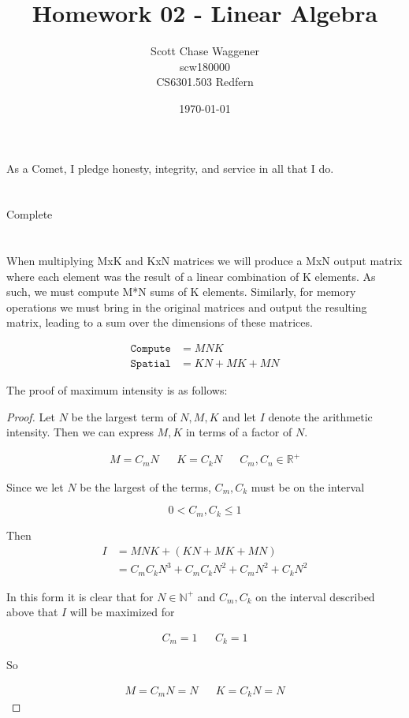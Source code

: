 \documentclass[12pt]{article}
\title{Homework 02 - Linear Algebra}
\author{
        Scott Chase Waggener \\
		scw180000 \\
		CS6301.503 Redfern
}
\date{\today}
\begin{document}
\maketitle
\begin{center}
As a Comet, I pledge honesty, integrity, and service in all that I do.
\end{center}

\section{}
Complete

\section{}
When multiplying MxK and KxN matrices we will produce a MxN output matrix
where each element was the result of a linear combination of K elements.
As such, we must compute M*N sums of K elements.
Similarly, for memory operations we must bring in the original matrices and output
the resulting matrix, leading to a sum over the dimensions of these matrices.

\begin{align}
	\texttt{Compute} &= M N K \\
	\texttt{Spatial} &= KN + MK + MN
\end{align}

The proof of maximum intensity is as follows:

\begin{proof}
	Let $N$ be the largest term of $N, M, K$ and let $I$ denote the arithmetic
	intensity. Then we can express $M, K$ in terms of a factor of $N$.

	\begin{align}
		M = C_m N && K = C_k N && C_m, C_n \in \mathbb R^+
	\end{align}

	Since we let $N$ be the largest of the terms, $C_m, C_k$ must be on the
	interval

	\begin{equation}
		0 < C_m, C_k \leq 1
	\end{equation}

	Then
	\begin{align}
		I &= M N K + \left(K N + M K + M N \right)\\
		& = C_m C_k N^3 + C_m C_k N^2 + C_m N^2 + C_k N^2
	\end{align}

	In this form it is clear that for $N \in \mathbb N^+$ and $C_m, C_k$ on the
	interval described above that $I$ will be maximized for

	\begin{align}
		C_m = 1 && C_k = 1
	\end{align}

	So

	\begin{align}
		M = C_m N = N && K = C_k N  = N
	\end{align}
\end{proof}
\end{document}
